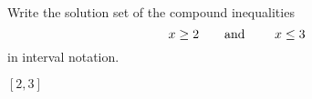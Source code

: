 

Write the solution set of the compound inequalities
\[x\geq 2 \text{\quad\quad and \quad\quad} x\leq 3 \]
in interval notation.

\begin{solution}
$[2, 3]$
\end{solution}